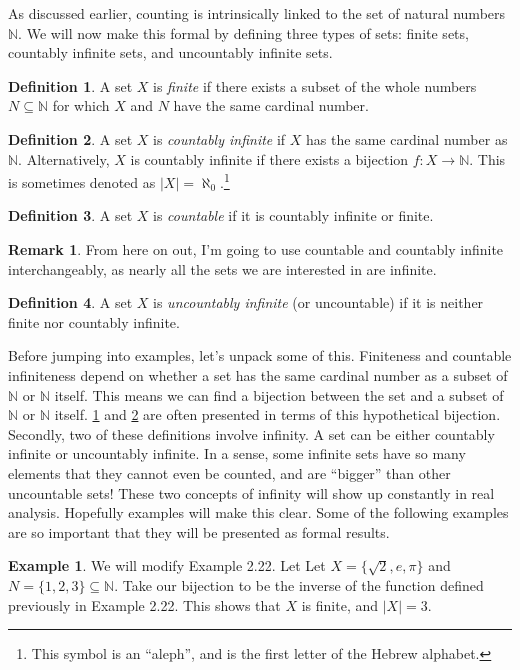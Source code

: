 \documentclass{article}
\newcommand{\N}{\mathbb{N}}
\theoremstyle{definition}
\newtheorem{definition}{Definition}[section]
\newtheorem{example}{Example}[section]
\newtheorem{remark}{Remark}[section]
\begin{document}
	As discussed earlier, counting is intrinsically linked to the set of natural numbers $ \N $. We will now make this formal by defining three types of sets: finite sets, countably infinite sets, and uncountably infinite sets.
	\begin{definition}\label{def1.22}
		A set $ X $ is \textit{\color{red}finite} if there exists a subset of the whole numbers $ N\subseteq \N $ for which $ X $ and $ N $ have the same cardinal number.
	\end{definition} 
	\begin{definition}\label{def1.23}
		A set $ X $ is \textit{\color{red}countably infinite} if $ X $ has the same cardinal number as $ \N $. Alternatively, $ X $ is countably infinite if there exists a bijection $ f:X\to\N $. This is sometimes denoted as $ |X|=\aleph_0 $.\footnote{This symbol is an ``aleph'', and is the first letter of the Hebrew alphabet.} 
	\end{definition}
	\begin{definition}\label{def1.24}
		A set $ X $ is \textit{\color{red}countable} if it is countably infinite or finite.
	\end{definition}
	\begin{remark}
		From here on out, I'm going to use countable and countably infinite interchangeably, as nearly all the sets we are interested in are infinite.  
	\end{remark}
	\begin{definition}\label{def1.25}
		A set $ X $ is  \textit{\color{red}uncountably infinite} (or uncountable) if it is neither finite nor countably infinite.
	\end{definition}
	Before jumping into examples, let's unpack some of this. Finiteness and countable infiniteness depend on whether a set has the same cardinal number as a subset of $ \N $ or $ \N $ itself. This means we can find a bijection between the set and a subset of $ \N $ or $ \N $ itself. \cref{def1.22} and  \cref{def1.23}  are often presented in terms of this hypothetical bijection. Secondly, two of these definitions involve infinity. A set can be either countably infinite or uncountably infinite. In a sense, some infinite sets have so many elements that they cannot even be counted, and are ``bigger'' than other uncountable sets! These two concepts of infinity will show up constantly in real analysis. Hopefully examples will make this clear. Some of the following examples are so important that they will be presented as formal results. 
	\begin{example}
		We will modify Example 2.22. Let Let $ X=\{\sqrt{2},e,\pi\} $ and $ N=\{1,2,3\}\subseteq \N$. Take our bijection to be the inverse of the function defined previously in Example 2.22. This shows that $ X $ is finite, and $ |X|=3 $. 
	\end{example}
\end{document}
